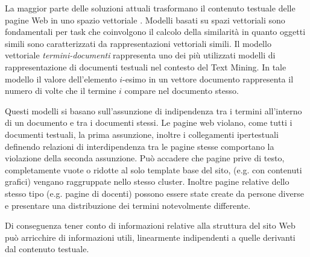 
\color{black}
La maggior parte delle soluzioni attuali trasformano il contenuto testuale delle pagine Web in uno spazio vettoriale \cite{Turney10}. Modelli basati su spazi vettoriali sono fondamentali per task che coinvolgono il calcolo della similarità in quanto oggetti simili sono caratterizzati da rappresentazioni vettoriali simili. Il modello vettoriale \textit{termini-documenti} rappresenta uno dei più utilizzati modelli di rappresentazione di documenti testuali nel contesto del Text Mining. In tale modello il valore dell'elemento $i$-esimo in un vettore documento rappresenta il numero di volte che il termine $i$ compare nel documento stesso.

Questi modelli si basano sull'assunzione di indipendenza tra i termini all'interno di un documento e tra i documenti stessi. Le pagine web violano, come tutti i documenti testuali, la prima assunzione, inoltre i collegamenti ipertestuali definendo relazioni di interdipendenza tra le pagine stesse comportano la violazione della seconda assunzione. Può accadere che pagine prive di testo, completamente vuote o ridotte al solo template base del sito, (e.g. con contenuti grafici) vengano raggruppate nello stesso cluster. Inoltre pagine relative dello stesso tipo (e.g. pagine di docenti) possono essere state create da persone diverse e presentare una distribuzione dei termini notevolmente differente. 

Di conseguenza tener conto di informazioni relative alla struttura del sito Web può arricchire di informazioni utili, linearmente indipendenti a quelle derivanti dal contenuto testuale.


